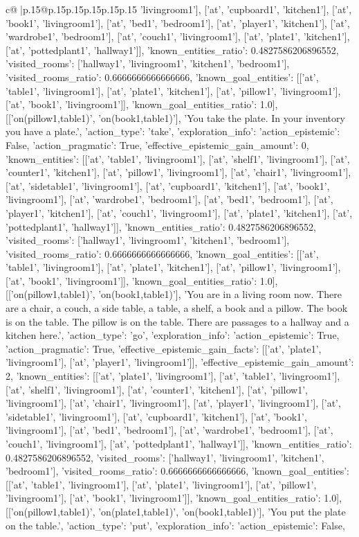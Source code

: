 \documentclass{article}
\begin{document}
{\begin{supertabular}{c@{$\;$}|p{.15\linewidth}@{}p{.15\linewidth}p{.15\linewidth}p{.15\linewidth}p{.15\linewidth}p{.15\linewidth}}
{{{'livingroom1'], ['at', 'cupboard1', 'kitchen1'], ['at', 'book1', 'livingroom1'], ['at', 'bed1', 'bedroom1'], ['at', 'player1', 'kitchen1'], ['at', 'wardrobe1', 'bedroom1'], ['at', 'couch1', 'livingroom1'], ['at', 'plate1', 'kitchen1'], ['at', 'pottedplant1', 'hallway1']], 'known_entities_ratio': 0.4827586206896552, 'visited_rooms': ['hallway1', 'livingroom1', 'kitchen1', 'bedroom1'], 'visited_rooms_ratio': 0.6666666666666666, 'known_goal_entities': [['at', 'table1', 'livingroom1'], ['at', 'plate1', 'kitchen1'], ['at', 'pillow1', 'livingroom1'], ['at', 'book1', 'livingroom1']], 'known_goal_entities_ratio': 1.0}}], [['on(pillow1,table1)', 'on(book1,table1)'], 'You take the plate. In your inventory you have a plate.\n', {'action_type': 'take', 'exploration_info': {'action_epistemic': False, 'action_pragmatic': True, 'effective_epistemic_gain_amount': 0, 'known_entities': [['at', 'table1', 'livingroom1'], ['at', 'shelf1', 'livingroom1'], ['at', 'counter1', 'kitchen1'], ['at', 'pillow1', 'livingroom1'], ['at', 'chair1', 'livingroom1'], ['at', 'sidetable1', 'livingroom1'], ['at', 'cupboard1', 'kitchen1'], ['at', 'book1', 'livingroom1'], ['at', 'wardrobe1', 'bedroom1'], ['at', 'bed1', 'bedroom1'], ['at', 'player1', 'kitchen1'], ['at', 'couch1', 'livingroom1'], ['at', 'plate1', 'kitchen1'], ['at', 'pottedplant1', 'hallway1']], 'known_entities_ratio': 0.4827586206896552, 'visited_rooms': ['hallway1', 'livingroom1', 'kitchen1', 'bedroom1'], 'visited_rooms_ratio': 0.6666666666666666, 'known_goal_entities': [['at', 'table1', 'livingroom1'], ['at', 'plate1', 'kitchen1'], ['at', 'pillow1', 'livingroom1'], ['at', 'book1', 'livingroom1']], 'known_goal_entities_ratio': 1.0}}], [['on(pillow1,table1)', 'on(book1,table1)'], 'You are in a living room now. There are a chair, a couch, a side table, a table, a shelf, a book and a pillow. The book is on the table. The pillow is on the table. There are passages to a hallway and a kitchen here.\n', {'action_type': 'go', 'exploration_info': {'action_epistemic': True, 'action_pragmatic': True, 'effective_epistemic_gain_facts': [['at', 'plate1', 'livingroom1'], ['at', 'player1', 'livingroom1']], 'effective_epistemic_gain_amount': 2, 'known_entities': [['at', 'plate1', 'livingroom1'], ['at', 'table1', 'livingroom1'], ['at', 'shelf1', 'livingroom1'], ['at', 'counter1', 'kitchen1'], ['at', 'pillow1', 'livingroom1'], ['at', 'chair1', 'livingroom1'], ['at', 'player1', 'livingroom1'], ['at', 'sidetable1', 'livingroom1'], ['at', 'cupboard1', 'kitchen1'], ['at', 'book1', 'livingroom1'], ['at', 'bed1', 'bedroom1'], ['at', 'wardrobe1', 'bedroom1'], ['at', 'couch1', 'livingroom1'], ['at', 'pottedplant1', 'hallway1']], 'known_entities_ratio': 0.4827586206896552, 'visited_rooms': ['hallway1', 'livingroom1', 'kitchen1', 'bedroom1'], 'visited_rooms_ratio': 0.6666666666666666, 'known_goal_entities': [['at', 'table1', 'livingroom1'], ['at', 'plate1', 'livingroom1'], ['at', 'pillow1', 'livingroom1'], ['at', 'book1', 'livingroom1']], 'known_goal_entities_ratio': 1.0}}], [['on(pillow1,table1)', 'on(plate1,table1)', 'on(book1,table1)'], 'You put the plate on the table.\n', {'action_type': 'put', 'exploration_info': {'action_epistemic': False, }}}
\end{supertabular}}
\end{document}
